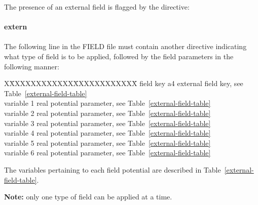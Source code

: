 The presence of an external field is flagged by the directive: \\
\\
{\bf extern} \\
\\
\noindent The following line in the FIELD file must contain another
directive indicating what type of field is to be applied, followed
by the field parameters in the following manner:
\begin{tabbing}
X\=XXXXXXXXXXXX\=XXXXXXXXXXXX\=\kill
\> field key     \> a4      \> external field key, see Table~\ref{external-field-table} \\
\> variable 1    \> real    \> potential parameter, see Table~\ref{external-field-table} \\
\> variable 2    \> real    \> potential parameter, see Table~\ref{external-field-table} \\
\> variable 3    \> real    \> potential parameter, see Table~\ref{external-field-table} \\
\> variable 4    \> real    \> potential parameter, see Table~\ref{external-field-table} \\
\> variable 5    \> real    \> potential parameter, see Table~\ref{external-field-table} \\
\> variable 6    \> real    \> potential parameter, see Table~\ref{external-field-table}
\end{tabbing}
The variables pertaining to each field potential are described
in Table~\ref{external-field-table}.

{\bf Note:} only one type of field can be applied at a time.


